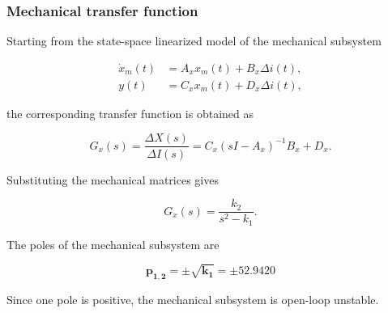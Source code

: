\subsubsection{Mechanical transfer function}

Starting from the state-space linearized model of the mechanical subsystem

\begin{align}
    \dot{x}_m(t) &= A_x x_m(t) + B_x \Delta i(t), \\
    y(t) &= C_x x_m(t) + D_x \Delta i(t),
\end{align}

the corresponding transfer function is obtained as

\begin{equation}
    G_x(s) =
    \frac{\Delta X(s)}{\Delta I(s)}
    =
    C_x(sI - A_x)^{-1}B_x + D_x.
\end{equation}

Substituting the mechanical matrices gives

\begin{equation}
    G_x(s) =
    \frac{k_2}{s^2 - k_1}.
\end{equation}

The poles of the mechanical subsystem are

\[
   \mathbf{p_{1,2} = \pm \sqrt{k_1} = \pm 52.9420}
\]

Since one pole is positive, the mechanical subsystem is open-loop unstable.
